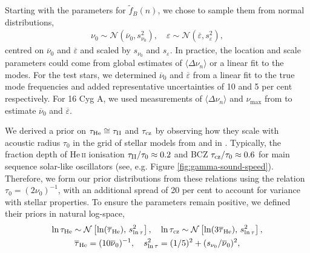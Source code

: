 Starting with the parameters for \(\tilde{f}_B(n)\), we chose to sample them from normal distributions,
%
\begin{gather*}
    \nu_0 \sim \mathcal{N}(\overline{\nu}_0, s_{\nu_0}^2), \quad \varepsilon \sim \mathcal{N}(\overline{\varepsilon}, s_\varepsilon^2),%
\end{gather*}
%
centred on \(\overline{\nu}_0\) and \(\overline{\varepsilon}\) and scaled by \(s_{\nu_0}\) and \(s_\varepsilon\). In practice, the location and scale parameters could come from global estimates of \(\langle\Delta\nu_n\rangle\) or a linear fit to the modes. For the test stars, we determined \(\overline{\nu}_0\) and \(\overline{\varepsilon}\) from a linear fit to the true mode frequencies and added representative uncertainties of 10 and 5 per cent respectively. For 16 Cyg A, we used measurements of \(\langle\Delta\nu_n\rangle\) and \(\nu_{\max}\) from \citet{Lund.SilvaAguirre.ea2017} to estimate \(\overline{\nu}_0\) and \(\overline{\varepsilon}\).


We derived a prior on \(\tau_{{\mathrm{He}}} \cong \tau_{{\mathrm{II}}}\) and \(\tau_{{\mathrm{cz}}}\) by observing how they scale with acoustic radius \(\tau_0\) in the grid of stellar models from \citep{Lyttle.Davies.ea2021} and in \citet{Verma.Rorsted.ea2022}. Typically, the fraction depth of He\,\textsc{ii} ionisation \(\tau_{{\mathrm{II}}}/\tau_0 \approx 0.2\) and BCZ \(\tau_{{\mathrm{cz}}}/\tau_0 \approx 0.6\) for main sequence solar-like oscillators (see, e.g. Figure \ref{fig:gamma-sound-speed}). Therefore, we form our prior distributions from these relations using the relation \({\tau}_0 = (2\nu_0)^{-1}\), with an additional spread of 20 per cent to account for variance with stellar properties. To ensure the parameters remain positive, we defined their priors in natural log-space,
%
\begin{gather*}
    \ln\tau_{{\mathrm{He}}} \sim \mathcal{N}\left[ \ln(\overline{\tau}_{{\mathrm{He}}}), \, s_{\ln\tau}^2 \right], \quad \ln\tau_{{\mathrm{cz}}} \sim \mathcal{N}\left[\ln(3\overline{\tau}_{{\mathrm{He}}}), \, s_{\ln\tau}^2 \right],\\
    \overline{\tau}_{{\mathrm{He}}} = (10 \overline{\nu}_0)^{-1}, \quad s_{\ln\tau}^2 = (1/5)^2 + (s_{\nu_0}/\overline{\nu}_0)^2,
\end{gather*}

